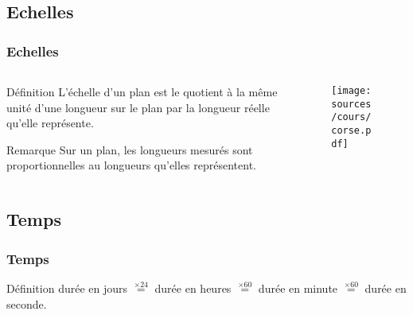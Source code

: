 \documentclass{beamer}
\begin{document}
\subsection{Echelles}

\begin{frame}
  \frametitle{Echelles}
      \begin{columns}[t]
      \begin{column}{6cm}
      
    \begin{alertblock}{Définition}	
    L'échelle d'un plan est le quotient à la même unité d'une longueur sur le plan par la longueur réelle qu'elle représente.
  \end{alertblock}

  \begin{block}{Remarque}
    Sur un plan, les longueurs mesurés sont proportionnelles au longueurs qu'elles représentent.
  \end{block}
       \end{column}
      \begin{column}{4cm}  
  \begin{figure}[H]
    \centering
    \texttt{[image: sources/cours/corse.pdf]}
  \end{figure}
        \end{column}
    \end{columns} 
\end{frame}


\subsection{Temps}

\begin{frame}
  \frametitle{Temps}
  \begin{alertblock}{Définition}	
  durée en jours $\stackrel{\times 24}{=}$ durée en heures $\stackrel{\times 60}{=}$ durée en minute $\stackrel{\times 60}{=}$ durée en seconde.
  \end{alertblock}
\end{frame}
\end{document}
